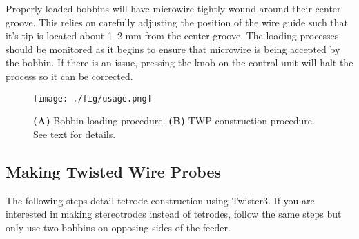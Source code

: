 \documentclass[11pt,a4paper]{article}
\begin{document}
Properly loaded bobbins will have microwire tightly wound around their center
groove. This relies on carefully adjusting the position of the wire guide such
that it's tip is located about 1--2 mm from the center groove. The loading
processes should be monitored as it begins to ensure that microwire is being
accepted by the bobbin. If there is an issue, pressing the knob on the
control unit will halt the process so it can be corrected.

\begin{figure}
\centering
\texttt{[image: ./fig/usage.png]}
\caption{\textbf{(A)} Bobbin loading procedure. \textbf{(B)} TWP construction
procedure. See text for details.}
\label{f:usage}
\end{figure}

\subsection{Making Twisted Wire Probes}
The following steps detail tetrode construction using Twister3. If you are
interested in making stereotrodes instead of tetrodes, follow the same steps but
only use two bobbins on opposing sides of the feeder.
\end{document}
